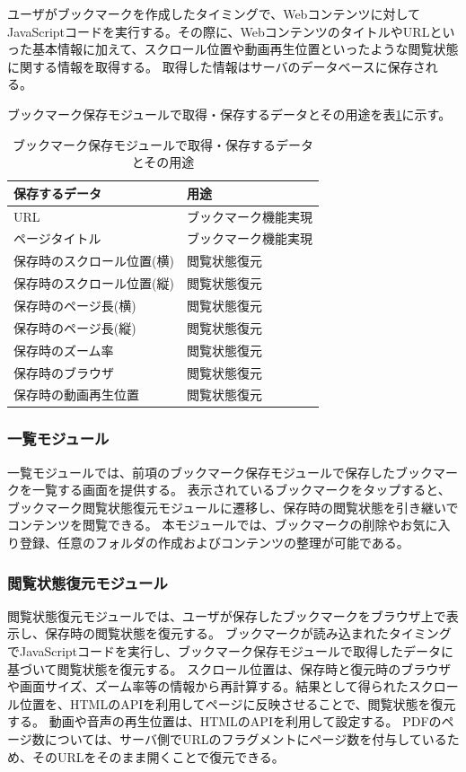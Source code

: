 ユーザがブックマークを作成したタイミングで、Webコンテンツに対してJavaScriptコードを実行する。その際に、WebコンテンツのタイトルやURLといった基本情報に加えて、スクロール位置や動画再生位置といったような閲覧状態に関する情報を取得する。
取得した情報はサーバのデータベースに保存される。

ブックマーク保存モジュールで取得・保存するデータとその用途を表\ref{tb:design-save-bookmark-data-usage}に示す。

\begin{table}[htbp]
  \label{tb:design-save-bookmark-data-usage}
  \caption{ブックマーク保存モジュールで取得・保存するデータとその用途}
  \begin{center}
    \begin{tabular}{|l|l|}
      \hline
      保存するデータ & 用途 \\\hline\hline
      URL & ブックマーク機能実現 \\\hline
      ページタイトル & ブックマーク機能実現 \\\hline
      保存時のスクロール位置(横) & 閲覧状態復元 \\\hline
      保存時のスクロール位置(縦) & 閲覧状態復元 \\\hline
      保存時のページ長(横) & 閲覧状態復元 \\\hline
      保存時のページ長(縦) & 閲覧状態復元 \\\hline
      保存時のズーム率 & 閲覧状態復元 \\\hline
      保存時のブラウザ & 閲覧状態復元 \\\hline
      保存時の動画再生位置 & 閲覧状態復元 \\\hline
    \end{tabular}
  \end{center}
\end{table}

\subsubsection{一覧モジュール}
一覧モジュールでは、前項のブックマーク保存モジュールで保存したブックマークを一覧する画面を提供する。
表示されているブックマークをタップすると、ブックマーク閲覧状態復元モジュールに遷移し、保存時の閲覧状態を引き継いでコンテンツを閲覧できる。
本モジュールでは、ブックマークの削除やお気に入り登録、任意のフォルダの作成およびコンテンツの整理が可能である。

\subsubsection{閲覧状態復元モジュール}
閲覧状態復元モジュールでは、ユーザが保存したブックマークをブラウザ上で表示し、保存時の閲覧状態を復元する。
ブックマークが読み込まれたタイミングでJavaScriptコードを実行し、ブックマーク保存モジュールで取得したデータに基づいて閲覧状態を復元する。
スクロール位置は、保存時と復元時のブラウザや画面サイズ、ズーム率等の情報から再計算する。結果として得られたスクロール位置を、HTMLのAPIを利用してページに反映させることで、閲覧状態を復元する。
動画や音声の再生位置は、HTMLのAPIを利用して設定する。
PDFのページ数については、サーバ側でURLのフラグメントにページ数を付与しているため、そのURLをそのまま開くことで復元できる。

